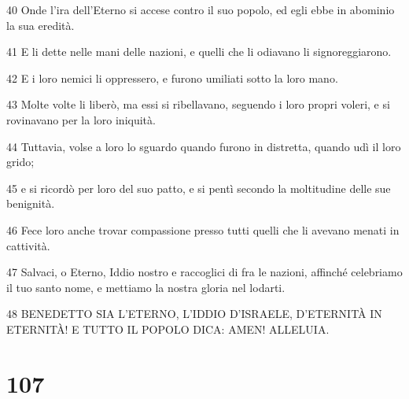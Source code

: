 \par 40 Onde l'ira dell'Eterno si accese contro il suo popolo, ed egli ebbe in abominio la sua eredità.
\par 41 E li dette nelle mani delle nazioni, e quelli che li odiavano li signoreggiarono.
\par 42 E i loro nemici li oppressero, e furono umiliati sotto la loro mano.
\par 43 Molte volte li liberò, ma essi si ribellavano, seguendo i loro propri voleri, e si rovinavano per la loro iniquità.
\par 44 Tuttavia, volse a loro lo sguardo quando furono in distretta, quando udì il loro grido;
\par 45 e si ricordò per loro del suo patto, e si pentì secondo la moltitudine delle sue benignità.
\par 46 Fece loro anche trovar compassione presso tutti quelli che li avevano menati in cattività.
\par 47 Salvaci, o Eterno, Iddio nostro e raccoglici di fra le nazioni, affinché celebriamo il tuo santo nome, e mettiamo la nostra gloria nel lodarti.
\par 48 BENEDETTO SIA L'ETERNO, L'IDDIO D'ISRAELE, D'ETERNITÀ IN ETERNITÀ! E TUTTO IL POPOLO DICA: AMEN! ALLELUIA.

\chapter{107}

